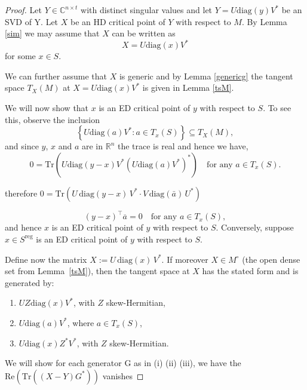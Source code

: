 \documentclass[11pt]{amsart}
\theoremstyle{plain}
\theoremstyle{definition}
\theoremstyle{remark}
\begin{document}
\begin{proof}
Let $Y\in \mathbb{C}^{n \times t }$ with distinct singular values and let $Y=U\mathrm{diag}(y)V^*$ be an SVD of Y.   Let $X$ be an HD critical point of $Y$ with respect to $M$. By Lemma \ref{sim} we may assume that $X$ can be written as
\[
X = U \mathrm{diag}(x) V^*
\]
for some $x \in S$.

We can further assume that $X$ is generic and by Lemma \ref{genericg} the tangent space $T_{X}(M)$ at $X = U \mathrm{diag}(x) V^*$ is given in Lemma \ref{tsM}.

We will now show that $x$ is an ED critical point of $y$ with respect to $S$. To see this, observe the inclusion
\[
\left\{ U \mathrm{diag}(a) V^* : a \in T_{x}(S) \right\} \subseteq T_X(M),
\]
and since $y$, $x$ and $a$ are in $\mathbb{R}^n$ the trace is real and hence we have,
\[
0 = \mathrm{Tr}\left( U \mathrm{diag}(y - x) V^* \left( U \mathrm{diag}(a) V^* \right)^* \right)
\quad \text{for any } a \in T_{x}(S).
\]

therefore $0 = \mathrm{Tr} \left( U \, \mathrm{diag}(y - x) \, V^* \cdot V \, \mathrm{diag}(\bar{a}) \, U^* \right)$

\[
(y - x)^\top \overline{a} = 0 \quad \text{for any } a \in T_{x}(S),
\]
and hence $x$ is an ED critical point of $y$ with respect to $S$.
Conversely, suppose \( x \in S^{\mathrm{reg}} \) is an ED critical point of \( y \) with respect to \( S \).  


Define now the matrix \( X := U \, \mathrm{diag}(x) \, V^* \). 
If moreover $X\in M^\circ$ (the open dense set from Lemma~\ref{tsM}),
then the tangent space at $X$ has the stated form and is generated by:


\begin{enumerate}
  \item \( U Z \mathrm{diag}(x) V^* \), with \( Z \) skew-Hermitian,
  \item \( U \mathrm{diag}(a) V^* \), where \( a \in T_{x}(S) \),
  \item \( U \mathrm{diag}(x) Z^* V^* \), with \( Z \) skew-Hermitian.
\end{enumerate}


We will show for each generator G as in (i) (ii) (iii), we have the $\mathrm{Re}  (\mathrm{Tr}((X-Y)G^*))$ vanishes


\end{proof}
\end{document}
